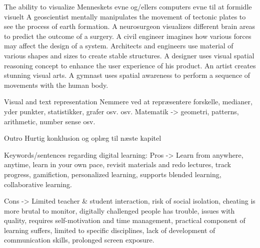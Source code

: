   The ability to visualize
    Menneskets evne og/ellers computers evne til at formidle visuelt 
    A geoscientist mentally manipulates the movement of tectonic plates to see the process of earth formation.
    A neurosurgeon visualizes different brain areas to predict the outcome of a surgery.
    A civil engineer imagines how various forces may affect the design of a system.
    Architects and engineers use material of various shapes and sizes to create stable structures.
    A designer uses visual spatial reasoning concept to enhance the user experience of his product.
    An artist creates stunning visual arts.
    A gymnast uses spatial awareness to perform a sequence of movements with the human body.

  Visual and text representation
    Nemmere ved at repræsentere forskelle, medianer, yder punkter, statistikker, grafer osv. osv.
    Matematik -> geometri, patterns, arithmetic, number sense osv.

  Outro
    Hurtig konklusion og oplæg til næste kapitel
    

Keywords/sentences regarding digital learning: 
  Pros -> Learn from anywhere, anytime, learn in your own pace, revisit materials and redo lectures, track progress, gamifiction, personalized learning, supports blended learning, collaborative learning.

  Cons -> Limited teacher & student interaction, risk of social isolation, cheating is more brutal to monitor, digitally challenged people has trouble, issues with quality, requires self-motivation and time management, practical component of learning suffers, limited to specific disciplines, lack of development of communication skills, prolonged screen exposure.